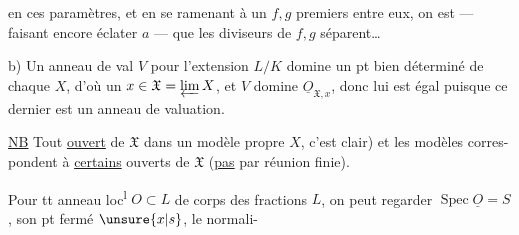 
en ces paramètres, et en se ramenant à un $f,g$ premiers entre eux, on est --- faisant encore éclater $a$ --- que les diviseurs de $f,g$  séparent\ldots

b) Un anneau de val $V$  pour l'extension $L/K$ domine un pt bien déterminé  de chaque $X$, d'où un $x\in\mathfrak X=\varprojlim X$, et $V$ domine $\underline{O}_{\mathfrak X,x}$, donc lui est égal puisque ce dernier est un anneau de valuation.

\uline{NB} Tout  \uline{ouvert} de $\mathfrak X$    dans un modèle propre $X$, c'est clair) et  les modèles corres-\\
pondent à \uline{certains} ouverts de $\mathfrak X$ (\uline{pas}  par réunion finie).

Pour tt anneau loc\textsuperscript{l}  $O\subset L$ de corps des fractions $L$, on peut regarder $\operatorname{Spec}\underline{O}=S$, son pt fermé $\unsure{x|s}$, le normali-

